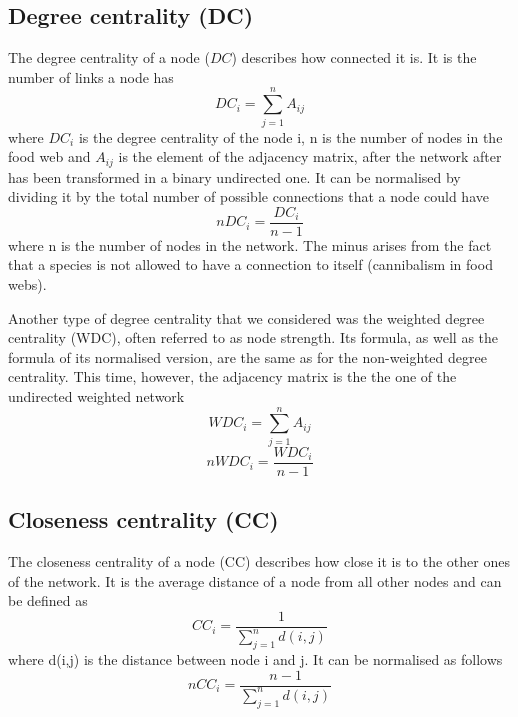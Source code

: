 \documentclass[twocolumn]{article}
\begin{document}
    \subsection*{Degree centrality (DC)}
        The degree centrality of a node ($DC$) describes how connected it is. It is the number of links a node has \citep{Wasserman1994} 
        \begin{equation}
            DC_i=\sum\limits_{j=1}^n A_{ij}    
        \end{equation}
        where $DC_i$ is the degree centrality of the node i, n is the number of nodes in the food web and $A_{ij}$ is the element of the adjacency matrix, after the network after has been transformed in a binary undirected one. It can be normalised by dividing it by the total number of possible connections that a node could have \citep{Wasserman1994} 
        \begin{equation}
            nDC_i=\frac{DC_i}{n-1}    
        \end{equation}
        where n is the number of nodes in the network. The minus arises from the fact that a species is not allowed to have a connection to itself (cannibalism in food webs).
        \par Another type of degree centrality that we considered was the weighted degree centrality (WDC), often referred to as node strength. Its formula, as well as the formula of its normalised version, are the same as for the non-weighted degree centrality. This time, however, the adjacency matrix is the the one of the undirected weighted network \citep{Fornito2016} 
        \begin{equation}
            WDC_i=\sum\limits_{j=1}^n A_{ij}
        \end{equation}
        \begin{equation}
            nWDC_i=\frac{WDC_i}{n-1}
        \end{equation}
    \subsection*{Closeness centrality (CC)}
        \indent The closeness centrality of a node (CC) describes how close it is to the other ones of the network. It is the average distance of a node from all other nodes and can be defined as \citep{Wasserman1994} 
        \begin{equation}
            CC_i=\frac{1}{\sum\limits_{j=1}^n d(i,j)}
        \end{equation} where d(i,j) is the distance between node i and j. It can be normalised as follows \citep{Wasserman1994}
        \begin{equation}
                nCC_i=\frac{n-1}{\sum\limits_{j=1}^n d(i,j)}
        \end{equation}
\end{document}
